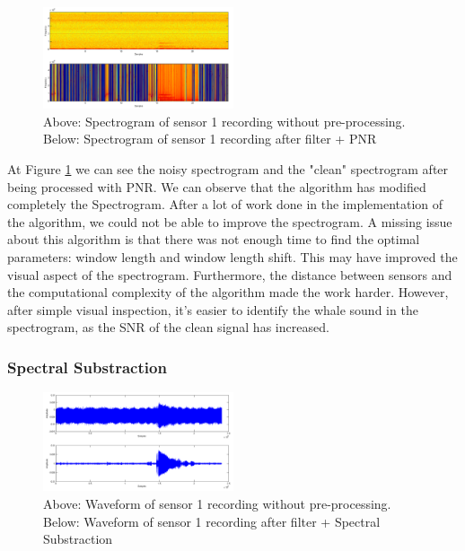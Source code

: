   \begin{figure}[htb]
	  \begin{center}
		  \includegraphics[width=0.5\textwidth]{figures/2PNR_spec.png}
	  \end{center}
	  \caption{Above: Spectrogram of sensor 1 recording without pre-processing. Below: Spectrogram of sensor 1 recording after filter + PNR}
	  \label{fig:result_PNR_spec}
  \end{figure}

  At Figure \ref{fig:result_PNR_spec} we can see the noisy spectrogram and the "clean" spectrogram after being processed with PNR. We can observe that the algorithm has modified completely the Spectrogram. After a lot of work done in the implementation of the algorithm, we could not be able to improve the spectrogram. A missing issue about this algorithm is that there was not enough time to find the optimal parameters: window length and window length shift. This may have improved the visual aspect of the spectrogram. Furthermore, the distance between sensors and the computational complexity of the algorithm made the work harder. However, after simple visual inspection, it's easier to identify the whale sound in the spectrogram, as the SNR of the clean signal has increased.
  

\subsubsection{Spectral Substraction}
  
  \begin{figure}[htb]
	  \begin{center}
		  \includegraphics[width=0.5\textwidth]{figures/3SpectralSub_waveform.png}
	  \end{center}
	  \caption{Above: Waveform of sensor 1 recording without pre-processing.  Below: Waveform of sensor 1 recording after filter + Spectral Substraction}
	  \label{fig:result_SS_waveform}
  \end{figure}
  
